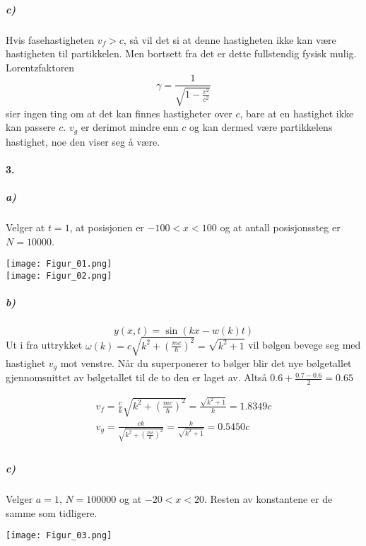 \documentclass[11pt, A4paper,norsk]{article}
\begin{document}
			\subparagraph{c)}
				\begin{flushleft}
Hvis fasehastigheten $v_f > c$, så vil det si at denne hastigheten ikke kan være hastigheten til partikkelen. Men bortsett fra det er dette fullstendig fysisk mulig. Lorentzfaktoren $$\gamma = \frac{1}{\sqrt{1 - \frac{v^2}{c^2}}}$$ sier ingen ting om at det kan finnes hastigheter over $c$, bare at en hastighet ikke kan passere $c$. $v_g$ er derimot mindre enn $c$ og kan dermed være partikkelens hastighet, noe den viser seg å være.
				\end{flushleft}









		\paragraph{3.}
			\subparagraph{a)}
				\begin{flushleft}
Velger at $t = 1$, at posisjonen er $-100 < x < 100$ og at antall posisjonssteg er $N = 10000$.
				\end{flushleft}
\texttt{[image: Figur\_01.png]} \\
\texttt{[image: Figur\_02.png]}









			\subparagraph{b)}
				\begin{flushleft}
$$y(x, t) = \sin\left(kx - w(k)t\right)$$
Ut i fra uttrykket $\omega(k) = c \sqrt{k^2 + \left( \frac{m c}{\hbar} \right)^2} = \sqrt{k^2 + 1}$ vil bølgen bevege seg med hastighet $v_g$ mot venstre. Når du superponerer to bølger blir det nye bølgetallet gjennomsnittet av bølgetallet til de to den er laget av. Altså $0.6 + \frac{0.7 - 0.6}{2} = 0.65$
				\end{flushleft}
				\begin{gather*}
v_f = \frac{c}{k} \sqrt{k^2 + \left( \frac{m c}{\hbar} \right)^2} = \frac{\sqrt{k^2 + 1}}{k} = 1.8349c \\
v_g = \frac{c k}{\sqrt{k^2 + \left( \frac{m c}{\hbar} \right)^2}} = \frac{k}{\sqrt{k^2 + 1}} = 0.5450c \\
				\end{gather*}











			\subparagraph{c)}
				\begin{flushleft}
Velger $a = 1$, $N = 100000$ og at $-20 < x < 20$. Resten av konstantene er de samme som tidligere.
				\end{flushleft}
\texttt{[image: Figur\_03.png]}

\end{document}
